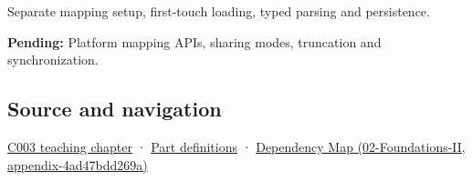 Separate mapping setup, first-touch loading, typed parsing and persistence.

\textbf{Pending:} Platform mapping APIs, sharing modes, truncation and synchronization.

\subsection{Source and navigation}\label{source-and-navigation}

\href{Continuous\%20Notes/Computing\%20Foundations\%20-\%20From\%20Bits\%20to\%20C++\%20and\%20Systems\%20APIs\#Where\%20the\%20bytes\%20live}{C003 teaching chapter} · \hyperref[appendix-fd090d982a15]{Part definitions} · \href{}{Dependency Map (02-Foundations-II, appendix-4ad47bdd269a)}
